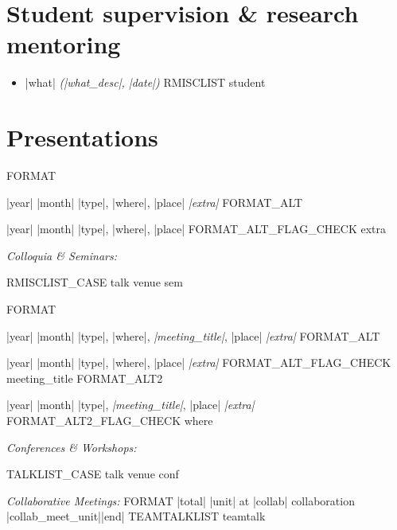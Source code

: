 \documentclass[line,10pt]{article}
\def\sectionfont{\fontsize{11pt}{0pt}\bf}
\newlength{\mainindent} \setlength{\mainindent}{15pt}
\newlength{\mainnegindent} \setlength{\mainnegindent}{-20pt}
\newlength{\mainextraindent} \setlength{\mainextraindent}{35pt}
\newlength{\contentindent} \setlength{\contentindent}{17ex}
\let\origsection\section
\renewcommand\section{\starsection}
\newcommand\starsection[1]
{\sectionprelude\origsection*{\sectionfont#1}\sectionpostlude}
\newcommand\sectionprelude{%
  \vspace{\sectionskip}
}
\newcommand\sectionpostlude{%
  \vspace{\sectionafterskip}
}
\newenvironment{datelist}{
  \begingroup
  \raggedright
  \begin{description}[labelindent=\mainindent,leftmargin=\contentindent,
      style=sameline,font=\normalfont,topsep=0pt,partopsep=1pt, 
      parsep=0pt,
      itemsep=0pt]
}{
  \end{description}
  \endgroup
}
\begin{document}
\section{Student supervision \& research mentoring}
\begin{itemize}[label={},itemindent=\mainnegindent,leftmargin=\mainextraindent,partopsep=1pt]  
  FORMAT \item |what| \emph{(|what_desc|, |date|)}
  RMISCLIST student
\end{itemize}





\section{Presentations}


FORMAT \item[|year| |month|] |type|, |where|, |place| \emph{|extra|}
FORMAT_ALT \item[|year| |month|] |type|, |where|, |place|
FORMAT_ALT_FLAG_CHECK extra

{\color{gray}\emph{Colloquia \& Seminars:}}
\vskip 1pt
\begin{datelist}
  RMISCLIST_CASE talk venue sem
\end{datelist}



FORMAT \item[|year| |month|] |type|, |where|, \emph{|meeting_title|}, |place| \emph{|extra|}
FORMAT_ALT \item[|year| |month|] |type|, |where|, |place| \emph{|extra|}
FORMAT_ALT_FLAG_CHECK meeting_title
FORMAT_ALT2 \item[|year| |month|] |type|, \emph{|meeting_title|}, |place| \emph{|extra|}
FORMAT_ALT2_FLAG_CHECK where


{\color{gray}\emph{Conferences \& Workshops:}}
\vskip 1pt
\begin{datelist}
TALKLIST_CASE talk venue conf
\end{datelist}



{\color{gray}\emph{Collaborative Meetings:}}
\vskip 2pt
FORMAT |total| |unit| at |collab| collaboration |collab_meet_unit||end|
\hglue \mainindent
TEAMTALKLIST teamtalk
\end{document}
